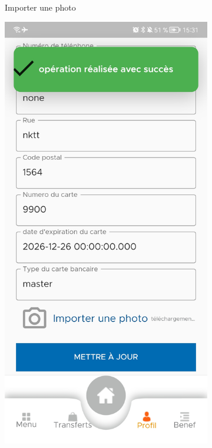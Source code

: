 \begin{figure}
\begin{subfigure}[b]{0.3\textwidth}
			\caption{Importer une photo}
			\label{fig:five over x}
		\end{subfigure}
		\newline
		\centering
		\begin{subfigure}{0.3\textwidth}
			\includegraphics[width=\hsize, valign=m ]{./Template LaTeX/Images/9.jpg}

\end{subfigure}
\end{figure}
